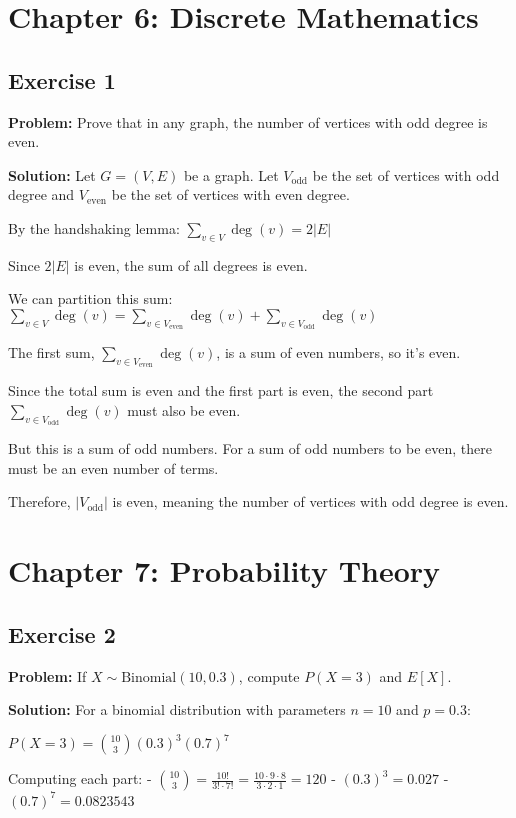 \section{Chapter 6: Discrete Mathematics}

\subsection{Exercise 1}
\textbf{Problem:} Prove that in any graph, the number of vertices with odd degree is even.

\textbf{Solution:}
Let $G = (V, E)$ be a graph. Let $V_{\text{odd}}$ be the set of vertices with odd degree and $V_{\text{even}}$ be the set of vertices with even degree.

By the handshaking lemma:
$\sum_{v \in V} \deg(v) = 2|E|$

Since $2|E|$ is even, the sum of all degrees is even.

We can partition this sum:
$\sum_{v \in V} \deg(v) = \sum_{v \in V_{\text{even}}} \deg(v) + \sum_{v \in V_{\text{odd}}} \deg(v)$

The first sum, $\sum_{v \in V_{\text{even}}} \deg(v)$, is a sum of even numbers, so it's even.

Since the total sum is even and the first part is even, the second part $\sum_{v \in V_{\text{odd}}} \deg(v)$ must also be even.

But this is a sum of odd numbers. For a sum of odd numbers to be even, there must be an even number of terms.

Therefore, $|V_{\text{odd}}|$ is even, meaning the number of vertices with odd degree is even.

\section{Chapter 7: Probability Theory}

\subsection{Exercise 2}
\textbf{Problem:} If $X \sim \text{Binomial}(10, 0.3)$, compute $P(X = 3)$ and $E[X]$.

\textbf{Solution:}
For a binomial distribution with parameters $n = 10$ and $p = 0.3$:

$P(X = 3) = \binom{10}{3} (0.3)^3 (0.7)^7$

Computing each part:
- $\binom{10}{3} = \frac{10!}{3! \cdot 7!} = \frac{10 \cdot 9 \cdot 8}{3 \cdot 2 \cdot 1} = 120$
- $(0.3)^3 = 0.027$
- $(0.7)^7 = 0.0823543$

